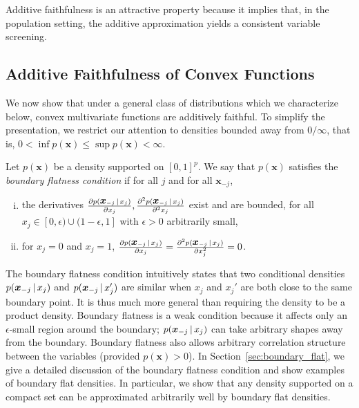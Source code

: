 
Additive faithfulness is an attractive property because it implies
that, in the population setting, the additive approximation yields
a consistent variable screening.

\subsection{Additive Faithfulness of Convex Functions}

We now show that under a general class of distributions which we
characterize below, convex multivariate functions are additively
faithful. To simplify the presentation, we restrict our attention to
densities bounded away from $0/\infty$, that is, $0 < \inf
p(\mathbf{x}) \leq \sup p(\mathbf{x}) < \infty$.

\begin{definition}
\label{defn:boundary-point}
Let $p(\mathbf{x})$ be a density supported on $[0,1]^p$. We say that
$p(\mathbf{x})$ satisfies the \emph{boundary flatness condition} if
for all $j$ and for all $\mathbf{x}_{-j}$, 
\begin{enumerate}[(i)]
\item the derivatives $\frac{\partial
  p(\mbox{\boldmath $x$}_{-j} {\,|\,} x_j)}{\partial x_j}, \frac{\partial^2
  p(\mbox{\boldmath $x$}_{-j} {\,|\,} x_j) }{\partial^2 x_j}$ exist and are bounded,
for all $x_j \in [0,  \epsilon) \cup (1-\epsilon, 1]$ 
with $\epsilon > 0$ arbitrarily small,
\item for $x_j=0$ and $x_j=1$,
$\frac{\partial p(\mbox{\boldmath $x$}_{-j} {\,|\,} x_j)}{\partial x_j}  =  
\frac{\partial^2 p(\mbox{\boldmath $x$}_{-j} {\,|\,} x_j)}{\partial x_j^2} = 0$.
\end{enumerate}

\end{definition}

The boundary flatness condition intuitively states that two
conditional densities $p(\mbox{\boldmath $x$}_{-j} {\,|\,} x_j)$ and
$p(\mbox{\boldmath $x$}_{-j} {\,|\,} x_j')$ are similar when $x_j$ and $x_j'$ are
both close to the same boundary point. It is thus much more general
than requiring the density to be a product density. Boundary flatness
is a weak condition because it affects only an $\epsilon$-small region
around the boundary; $p(\mbox{\boldmath $x$}_{-j} {\,|\,} x_j)$ can take
arbitrary shapes away from the boundary. Boundary flatness also allows
arbitrary correlation structure between the variables (provided
$p(\mathbf{x}) >0$). In Section~\ref{sec:boundary_flat}, we give a
detailed discussion of the boundary flatness condition and show
examples of boundary flat densities. In particular, we show that any
density supported on a compact set can be approximated arbitrarily
well by boundary flat densities.




